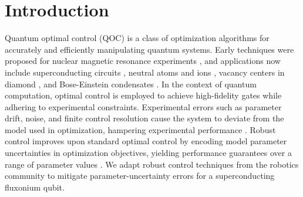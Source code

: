 \documentclass[
  amsfonts,
  amsmath,
  amssymb,
  pra,
  twocolumn,
  superscriptaddress,
]{revtex4-2}
\begin{document}
\maketitle

\section{Introduction}
Quantum optimal control (QOC) is a class of optimization
algorithms for accurately and efficiently manipulating quantum systems.
Early techniques were proposed for nuclear magnetic resonance experiments
\cite{vandersypen2005nmr, kehlet2004improving, khaneja2005optimal,
  maximov2008optimal, nielsen2010optimal, skinner2003application, tosner2009optimal},
and applications now include superconducting circuits \cite{abdelhafez2020universal,
  boutin2017resonator, chakram2020multimode, egger2013optimized,
  fisher2010optimal, gokhale2019partial,
  huang2014optimal, heeres2017implementing, kelly2014optimal, leng2019robust,
  leung2017speedup, li2020fast,
  liebermann2016optimal, reinhold2019controlling,
  rebentrost2009optimal, rebentrost2009optimal2, spiteri2018quantum,
  sporl2007optimal},
neutral atoms and ions \cite{brouzos2015quantum,
  de2008optimal, grace2007optimal, goerz2011quantum, guo2019high, jensen2019time,
  larrouy2020fast, nebendahl2009optimal, omran2019generation,
  rosi2013fast,
  treutlein2006microwave, van2016optimal},
vacancy centers in diamond \cite{chou2015optimal,
  dolde2014high, geng2016experimental,
  nobauer2015smooth, poggiali2018optimal, rembold2020introduction, tian2019optimal},
and Bose-Einstein condensates \cite{amri2019optimal, doria2011optimal,
  sorensen2019qengine, sorensen2018quantum}.
In the context of quantum computation,
optimal control is employed to achieve high-fidelity gates
while adhering to experimental constraints.
Experimental errors such as parameter drift, noise, and
finite control resolution cause the system to deviate
from the model used in optimization, hampering
experimental performance
\cite{chakram2020multimode, heeres2017implementing, klimov2020snake,
  omran2019generation, reinhold2019controlling}.
Robust control improves upon
standard optimal control by encoding
model parameter uncertainties
in optimization objectives, yielding performance
guarantees over a range of parameter values \cite{Zhou97,Morimoto00,Manchester18}.
We adapt robust control techniques from the robotics community to mitigate
parameter-uncertainty errors for
a superconducting fluxonium qubit.
\end{document}
